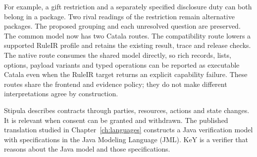 \begin{MapDiagram}
\end{MapDiagram}

For example, a gift restriction and a separately specified disclosure duty can
both belong in a package. Two rival readings of the restriction remain
alternative packages. The proposed grouping and each unresolved question are
preserved. The common model now has two Catala routes. The compatibility route
lowers a supported RuleIR profile and retains the existing result, trace and
release checks. The native route consumes the shared model directly, so rich
records, lists, options, payload variants and typed operations can be reported
as executable Catala even when the RuleIR target returns an explicit capability
failure. These routes share the frontend and evidence policy; they do not make
different interpretations agree by construction.

\clearpage
{}
Stipula describes contracts through parties, resources, actions and state
changes. It is relevant when consent can be granted and withdrawn. The
published translation studied in Chapter~\ref{ch:languages} constructs a Java
verification model with specifications in the Java Modeling Language (JML).
KeY is a verifier that reasons about the Java model and those specifications.

\begin{MapDiagram}
\end{MapDiagram}


